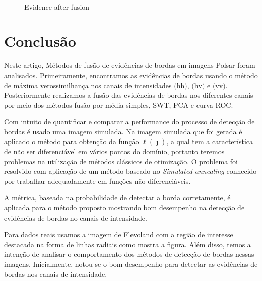 \documentclass[conference]{IEEEtran}
\begin{document}
\begin{figure}[hbt]
{     }
     \\
     \caption{Evidence after fusion}
     \label{fig12}
   \end{figure}	

\section{Conclusão}\label{sec_08}

Neste artigo, Métodos de fusão de evidências de bordas em imagens Polsar foram analisados. Primeiramente, encontramos as evidências de bordas usando o método de máxima verossimilhança nos canais de intensidades $\text{(hh)}$, $\text{(hv)}$ e $\text{(vv)}$. Posteriormente realizamos a fusão das evidências de bordas nos diferentes canais por meio dos métodos fusão por média simples, SWT, PCA e curva ROC.

Com intuito de quantificar e comparar a performance do processo de detecção de bordas é usado uma imagem simulada. Na imagem simulada que foi gerada é aplicado o método para obtenção  da função $\ell(\jmath)$, a qual tem a característica de não ser diferenciável em vários pontos do domínio, portanto teremos problemas na utilização de métodos clássicos de otimização. O problema foi resolvido com aplicação de um método baseado no {\it Simulated annealing} conhecido por trabalhar adequadamente em funções não diferenciáveis.

 A métrica, baseada na probabilidade de detectar a borda corretamente, é aplicada para o método proposto mostrando bom desempenho na detecção de evidências de bordas no canais de intensidade.
  
  Para dados reais usamos a imagem de Flevoland com a região de interesse destacada na forma de linhas radiais como mostra a figura. Além disso, temos a intenção de analisar o comportamento dos métodos de detecção de bordas nessas imagens. Inicialmente, notou-se o bom desempenho para detectar as evidências de bordas nos canais de intensidade.   
   
  


\end{document}
